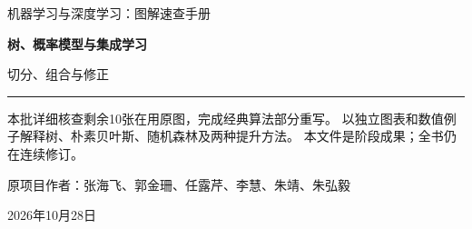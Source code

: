 \documentclass[a4paper,11pt,oneside,openany]{book}
\begin{document}
\frontmatter
\hypersetup{pageanchor=false}
\begin{titlepage}
\vspace*{16mm}
{\sffamily\color{Teal}\large 机器学习与深度学习：图解速查手册\par}
\vspace{15mm}
{\sffamily\bfseries\color{Ink}\Huge 树、概率模型与集成学习\par}
\vspace{6mm}
{\sffamily\color{Ink}\LARGE 切分、组合与修正\par}
\vspace{12mm}
\noindent\textcolor{Teal}{\rule{\textwidth}{1.2pt}}
\vspace{7mm}
\begin{keyidea}[第八批阶段样章]
本批详细核查剩余10张在用原图，完成经典算法部分重写。
以独立图表和数值例子解释树、朴素贝叶斯、随机森林及两种提升方法。
本文件是阶段成果；全书仍在连续修订。
\end{keyidea}
\vfill
原项目作者：张海飞、郭金珊、任露芹、李慧、朱靖、朱弘毅\par
\vspace{4mm}
2026年10月28日\par
\end{titlepage}
\hypersetup{pageanchor=true}
\tableofcontents
\mainmatter
\setcounter{chapter}{7}

\end{document}
